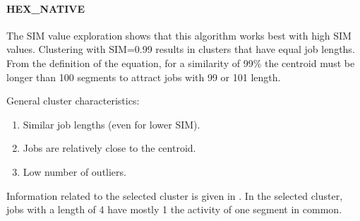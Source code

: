 \documentclass{jhps}
\makeatletter
\newcommand{\jk}[1]{\todo[inline]{JK:\@#1}}
\newcommand{\eb}[1]{\todo[inline, color=GreenYellow]{EB:\@#1}}
\makeatother
\begin{document}
\paragraph{HEX\_NATIVE}
The SIM value exploration shows that this algorithm works best with high SIM values.
Clustering with SIM=0.99 results in clusters that have equal job lengths.
From the definition of the equation, for a similarity of 99\% the centroid must be longer than 100 segments to attract jobs with 99 or 101 length.

General cluster characteristics:
\begin{enumerate}
 \item Similar job lengths (even for lower SIM).
 \item Jobs are relatively close to the centroid.
 \item Low number of outliers.
\end{enumerate}

Information related to the selected cluster is given in .
In the selected cluster, jobs with a length of 4 have mostly 1 the activity of one segment in common.





\end{document}

